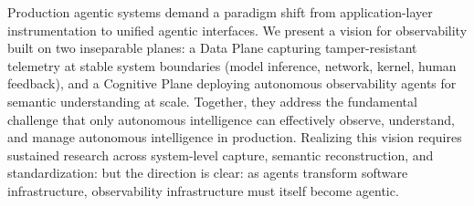 \documentclass[sigplan,screen,9pt]{acmart}
\begin{document}
Production agentic systems demand a paradigm shift from application-layer instrumentation to unified agentic interfaces. We present a vision for observability built on two inseparable planes: a Data Plane capturing tamper-resistant telemetry at stable system boundaries (model inference, network, kernel, human feedback), and a Cognitive Plane deploying autonomous observability agents for semantic understanding at scale. Together, they address the fundamental challenge that only autonomous intelligence can effectively observe, understand, and manage autonomous intelligence in production. Realizing this vision requires sustained research across system-level capture, semantic reconstruction, and standardization: but the direction is clear: as agents transform software infrastructure, observability infrastructure must itself become agentic.




\end{document}

